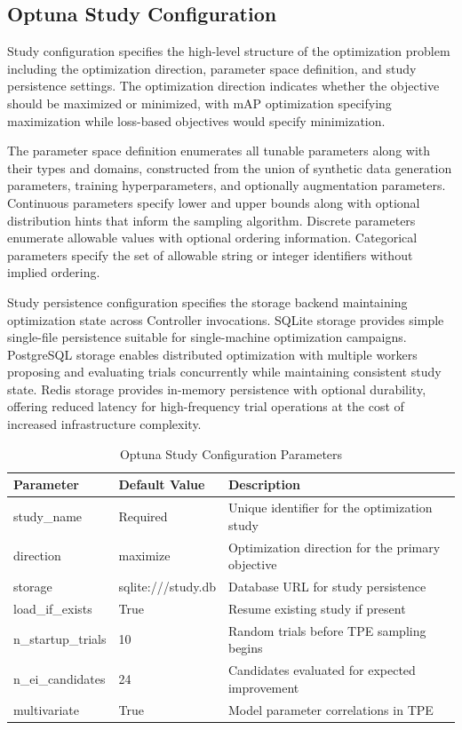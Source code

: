 \subsection{Optuna Study Configuration}

Study configuration specifies the high-level structure of the optimization problem including the optimization direction, parameter space definition, and study persistence settings. The optimization direction indicates whether the objective should be maximized or minimized, with mAP optimization specifying maximization while loss-based objectives would specify minimization.

The parameter space definition enumerates all tunable parameters along with their types and domains, constructed from the union of synthetic data generation parameters, training hyperparameters, and optionally augmentation parameters. Continuous parameters specify lower and upper bounds along with optional distribution hints that inform the sampling algorithm. Discrete parameters enumerate allowable values with optional ordering information. Categorical parameters specify the set of allowable string or integer identifiers without implied ordering.

Study persistence configuration specifies the storage backend maintaining optimization state across Controller invocations. SQLite storage provides simple single-file persistence suitable for single-machine optimization campaigns. PostgreSQL storage enables distributed optimization with multiple workers proposing and evaluating trials concurrently while maintaining consistent study state. Redis storage provides in-memory persistence with optional durability, offering reduced latency for high-frequency trial operations at the cost of increased infrastructure complexity.

\begin{table}[htbp]
\centering
\caption{Optuna Study Configuration Parameters}
\label{tab:optuna_config}
\begin{tabular}{p{3.5cm}p{3cm}p{6.5cm}}
\toprule
\textbf{Parameter} & \textbf{Default Value} & \textbf{Description} \\
\midrule
study\_name & Required & Unique identifier for the optimization study \\
direction & maximize & Optimization direction for the primary objective \\
storage & sqlite:///study.db & Database URL for study persistence \\
load\_if\_exists & True & Resume existing study if present \\
n\_startup\_trials & 10 & Random trials before TPE sampling begins \\
n\_ei\_candidates & 24 & Candidates evaluated for expected improvement \\
multivariate & True & Model parameter correlations in TPE \\
\bottomrule
\end{tabular}
\end{table}


